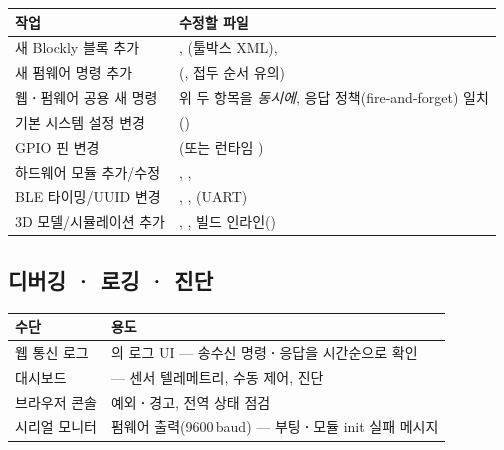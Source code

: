 \begin{longtable}{L{4.6cm} L{9.4cm}}
\toprule
{}\textbf{작업} & \textbf{수정할 파일} \\
\midrule
\endhead
새 Blockly 블록 추가 & , (툴박스 XML),
   \\
새 펌웨어 명령 추가 & (, 접두 순서 유의) \\
웹\textbf{·}펌웨어 공용 새 명령 & 위 두 항목을 \emph{동시에}, 응답 정책(fire-and-forget) 일치 \\
기본 시스템 설정 변경 & () \\
GPIO 핀 변경 & (또는 런타임 ) \\
하드웨어 모듈 추가/수정 & , ,  \\
BLE 타이밍/UUID 변경 & , , (UART) \\
3D 모델/시뮬레이션 추가 & , , 빌드 인라인() \\
\bottomrule
\end{longtable}

\subsection{디버깅 \textbf{·} 로깅 \textbf{·} 진단}

\begin{longtable}{L{3.0cm} L{11.0cm}}
\toprule
{}\textbf{수단} & \textbf{용도} \\
\midrule
\endhead
웹 통신 로그 & 의 로그 UI --- 송수신 명령\textbf{·}응답을 시간순으로 확인 \\
대시보드 &  --- 센서 텔레메트리, 수동 제어, 진단 \\
브라우저 콘솔 & 예외\textbf{·}경고,  전역 상태 점검 \\
시리얼 모니터 & 펌웨어  출력(9600\,baud) --- 부팅\textbf{·}모듈 init 실패 메시지 \\
\bottomrule
\end{longtable}

